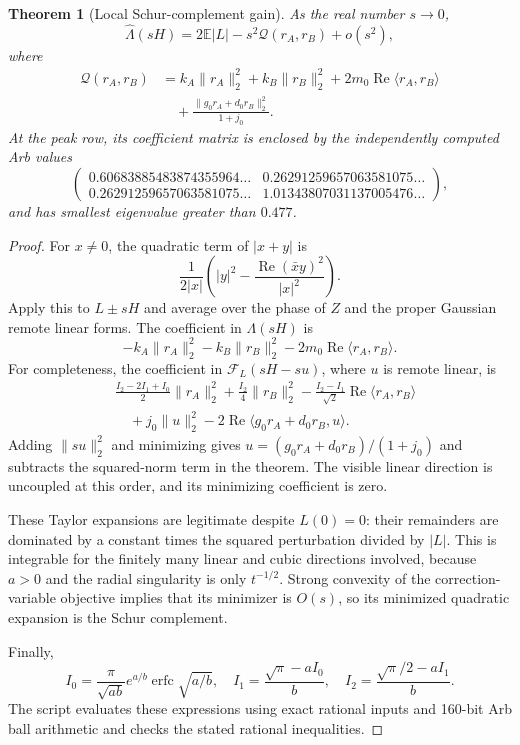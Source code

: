 \documentclass[11pt]{article}
\newtheorem{theorem}{Theorem}
\newcommand{\E}{\mathbb E}
\newcommand{\Rea}{\operatorname{Re}}
\begin{document}
\begin{theorem}[Local Schur-complement gain]\label{thm:matrix}
As the real number $s\to0$,
\[
 \widehat\Lambda(sH)=2\E|L|-s^2\mathcal Q(r_A,r_B)+o(s^2),
\]
where
\begin{align*}
 \mathcal Q(r_A,r_B)
 &=k_A\|r_A\|_2^2+k_B\|r_B\|_2^2
   +2m_0\Rea\langle r_A,r_B\rangle\\
 &\quad+\frac{\|g_0r_A+d_0r_B\|_2^2}{1+j_0}.
\end{align*}
At the peak row, its coefficient matrix is enclosed by the independently
computed Arb values
\[
 \begin{pmatrix}
 0.60683885483874355964\ldots&0.26291259657063581075\ldots\\
 0.26291259657063581075\ldots&1.01343807031137005476\ldots
 \end{pmatrix},
\]
and has smallest eigenvalue greater than $0.477$.
\end{theorem}
\begin{proof}
For $x\ne0$, the quadratic term of $|x+y|$ is
\[
 \frac1{2|x|}\left(|y|^2-
       \frac{\Rea(\bar x y)^2}{|x|^2}\right).
\]
Apply this to $L\pm sH$ and average over the phase of $Z$ and the proper
Gaussian remote linear forms. The coefficient in $\Lambda(sH)$ is
\[
 -k_A\|r_A\|_2^2-k_B\|r_B\|_2^2
 -2m_0\Rea\langle r_A,r_B\rangle.
\]
For completeness, the coefficient in $\mathcal F_L(sH-su)$, where $u$ is
remote linear, is
\begin{align*}
 &\frac{I_2-2I_1+I_0}{2}\|r_A\|_2^2
 +\frac{I_2}{4}\|r_B\|_2^2
 -\frac{I_2-I_1}{\sqrt2}\Rea\langle r_A,r_B\rangle\\
 &\quad+j_0\|u\|_2^2
 -2\Rea\langle g_0r_A+d_0r_B,u\rangle.
\end{align*}
Adding $\|su\|_2^2$ and minimizing gives
$u=(g_0r_A+d_0r_B)/(1+j_0)$ and subtracts the squared-norm term in the theorem.
The visible linear direction is uncoupled at this order, and its minimizing
coefficient is zero.

These Taylor expansions are legitimate despite $L(0)=0$: their remainders
are dominated by a constant times the squared perturbation divided by $|L|$.
This is integrable for the finitely many linear and cubic directions involved,
because $a>0$ and the radial singularity is only $t^{-1/2}$.
Strong convexity of the correction-variable objective implies that its
minimizer is $O(s)$, so its minimized quadratic expansion is the Schur complement.

Finally,
\[
 I_0=\frac{\pi}{\sqrt{ab}}e^{a/b}\operatorname{erfc}\sqrt{a/b},\quad
 I_1=\frac{\sqrt\pi-aI_0}{b},\quad
 I_2=\frac{\sqrt\pi/2-aI_1}{b}.
\]
The script evaluates these expressions using exact rational inputs and
160-bit Arb ball arithmetic and checks the stated rational inequalities.
\end{proof}
\end{document}
